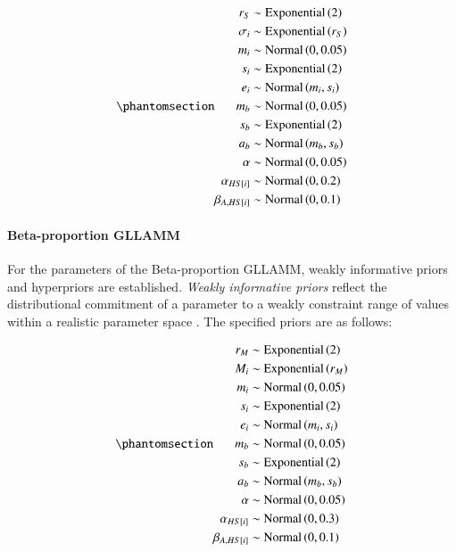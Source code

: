 \documentclass[
  authoryear,
  preprint,
  1p]{elsarticle}
\let\oldparagraph\paragraph
\renewcommand{\paragraph}[1]{\oldparagraph{#1}\mbox{}}
\begin{document}
\begin{equation}\phantomsection\label{eq-normal-LMM-priors}{
\begin{aligned}
r_{S} &\sim \text{Exponential}\left( 2 \right) \\ 
\sigma_{i} &\sim \text{Exponential}\left( r_{S} \right) \\
m_{i} &\sim \text{Normal} \left( 0, 0.05 \right) \\
s_{i} &\sim \text{Exponential} \left( 2 \right) \\
e_{i} &\sim \text{Normal} \left( m_{i}, s_{i} \right) \\
m_{b} &\sim \text{Normal} \left( 0, 0.05 \right) \\
s_{b} &\sim \text{Exponential} \left( 2 \right) \\
a_{b} &\sim \text{Normal} \left( m_{b}, s_{b} \right) \\
\alpha &\sim \text{Normal} \left( 0, 0.05 \right) \\
\alpha_{HS[i]} &\sim \text{Normal} \left( 0, 0.2 \right) \\
\beta_{A,HS[i]} &\sim \text{Normal} \left( 0, 0.1 \right)
\end{aligned} 
}\end{equation}

\paragraph{Beta-proportion GLLAMM}\label{sec-M-SM-P-BGLLAMM}

For the parameters of the Beta-proportion GLLAMM, weakly informative
priors and hyperpriors are established. \emph{Weakly informative priors}
reflect the distributional commitment of a parameter to a weakly
constraint range of values within a realistic parameter space
\citep{McElreath_2020}. The specified priors are as follows:

\begin{equation}\phantomsection\label{eq-beta-GLLAMM-priors}{
\begin{aligned}
r_{M} &\sim \text{Exponential}\left( 2 \right) \\ 
M_{i} &\sim \text{Exponential}\left( r_{M} \right) \\
m_{i} &\sim \text{Normal} \left( 0, 0.05 \right) \\
s_{i} &\sim \text{Exponential} \left( 2 \right) \\
e_{i} &\sim \text{Normal} \left( m_{i}, s_{i} \right) \\
m_{b} &\sim \text{Normal} \left( 0, 0.05 \right) \\
s_{b} &\sim \text{Exponential} \left( 2 \right) \\
a_{b} &\sim \text{Normal} \left( m_{b}, s_{b} \right) \\
\alpha &\sim \text{Normal} \left( 0, 0.05 \right) \\
\alpha_{HS[i]} &\sim \text{Normal} \left( 0, 0.3 \right) \\
\beta_{A,HS[i]} &\sim \text{Normal} \left( 0, 0.1 \right)
\end{aligned} 
}\end{equation}
\end{document}
